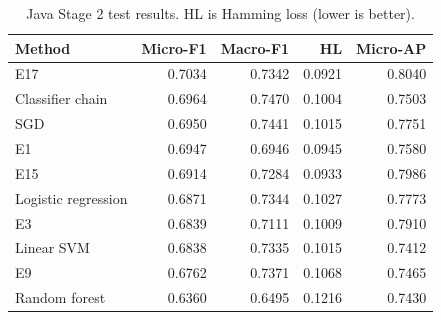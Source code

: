 \begin{table}[htbp]
\centering\small
\caption{Java Stage 2 test results. HL is Hamming loss (lower is better).}\label{tab:javatest}
\begin{tabular}{lrrrr}\toprule
Method & Micro-F1 & Macro-F1 & HL & Micro-AP\\\midrule
E17 & 0.7034 & 0.7342 & 0.0921 & 0.8040\\
Classifier chain & 0.6964 & 0.7470 & 0.1004 & 0.7503\\
SGD & 0.6950 & 0.7441 & 0.1015 & 0.7751\\
E1 & 0.6947 & 0.6946 & 0.0945 & 0.7580\\
E15 & 0.6914 & 0.7284 & 0.0933 & 0.7986\\
Logistic regression & 0.6871 & 0.7344 & 0.1027 & 0.7773\\
E3 & 0.6839 & 0.7111 & 0.1009 & 0.7910\\
Linear SVM & 0.6838 & 0.7335 & 0.1015 & 0.7412\\
E9 & 0.6762 & 0.7371 & 0.1068 & 0.7465\\
Random forest & 0.6360 & 0.6495 & 0.1216 & 0.7430\\
\bottomrule\end{tabular}
\end{table}
